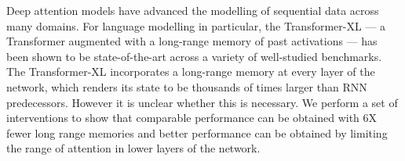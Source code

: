 Deep attention models have advanced the modelling of sequential data across many domains. For language modelling in particular, the Transformer-XL --- a Transformer augmented with a long-range memory of past activations --- has been shown to be state-of-the-art across a variety of well-studied benchmarks. The Transformer-XL incorporates a long-range memory at every layer of the network, which renders its state to be thousands of times larger than RNN predecessors. However it is unclear whether this is necessary. We perform a set of interventions to show that comparable performance can be obtained with 6X fewer long range memories and better performance can be obtained by limiting the range of attention in lower layers of the network.

